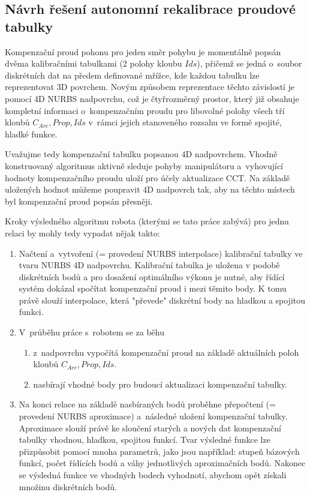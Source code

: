 \subsection{Návrh řešení autonomní rekalibrace proudové tabulky}
Kompenzační proud pohonu pro jeden směr pohybu je momentálně popsán dvěma kalibračními tabulkami (2 polohy kloubu $Ids$), přičemž se jedná o~soubor diskrétních dat na předem definované mřížce, kde každou tabulku lze reprezentovat 3D povrchem. Novým způsobem reprezentace těchto závislostí je pomocí 4D NURBS nadpovrchu, což je čtyřrozměrný prostor, který již obsahuje kompletní informaci o~kompenzačním proudu pro libovolné polohy všech tří kloubů $C_{Arc}, Prop, Ids$ v~rámci jejich stanoveného rozsahu ve formě spojité, hladké funkce.
\par
Uvažujme tedy kompenzační tabulku popsanou 4D nadpovrchem. Vhodně konstruo\-vaný algoritmus aktivně sleduje pohyby manipulátoru a~vyhovující hodnoty kompenzačního proudu uloží pro účely aktualizace CCT. Na základě uložených hodnot můžeme poupravit 4D nadpovrch tak, aby na těchto místech byl kompenzační proud popsán přesněji.
\par
Kroky výsledného algoritmu robota (kterými se tato práce zabývá) pro jednu relaci by mohly tedy vypadat nějak takto:
\begin{enumerate}
    \item Načtení a~vytvoření (= provedení NURBS interpolace) kalibrační tabulky ve tvaru NURBS 4D nadpovrchu. Kalibrační tabulka je uložena v podobě diskrétních bodů a pro dosažení optimálního výkonu je nutné, aby řídící systém dokázal spočítat kompenzační proud i mezi těmito body. K tomu právě slouží interpolace, která "převede" diskrétní body na hladkou a spojitou funkci.
    \item \label{item:průběh práce} V~průběhu práce s~robotem se za běhu
          \begin{enumerate}
              \item z~nadpovrchu vypočítá kompenzační proud na základě aktuálních poloh kloubů $C_{Arc}, Prop, Ids$.
              \item nasbírají vhodné body pro budoucí aktualizaci kompenzační tabulky.
          \end{enumerate}
    \item \label{item:konec relace} Na konci relace na základě nasbíraných bodů proběhne přepočtení (= provedení NURBS aproximace) a~následné uložení kompenzační tabulky. Aproximace slouží právě ke sloučení starých a nových dat kompenzační tabulky vhodnou, hladkou, spojitou funkcí. Tvar výsledné funkce lze přizpůsobit pomocí mnoha parametrů, jako jsou například: stupeň bázových funkcí, počet řídících bodů a váhy jednotlivých aproximačních bodů. Nakonec se výsledná funkce ve vhodných bodech vyhodnotí, abychom opět získali množinu diskrétních bodů.
\end{enumerate}
